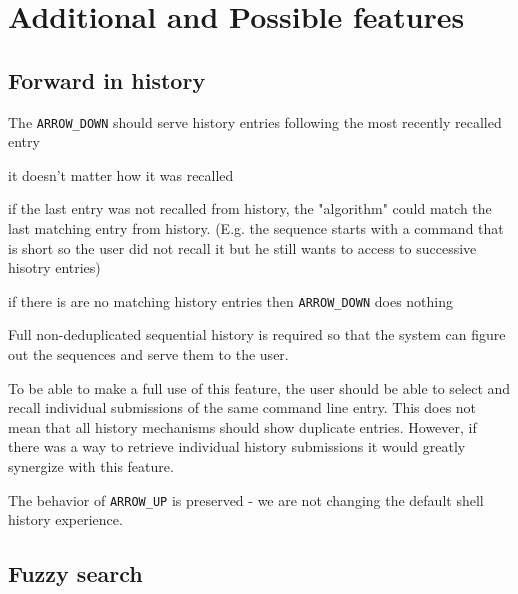 \documentclass[thesis=M,english]{FITthesis}[2012/10/20]
\newcommand{\todotext}[1]{\textcolor{red}{\textbf{[[#1]]}}}
\begin{document}




\section{Additional and Possible features}


\subsection{Forward in history}


The \verb|ARROW_DOWN| should serve history entries following the most recently recalled entry

it doesn't matter how it was recalled

if the last entry was not recalled from history, the "algorithm" could match the last matching entry from history. (E.g. the sequence starts with a command that is short so the user did not recall it but he still wants to access to successive hisotry entries)

if there is are no matching history entries then \verb|ARROW_DOWN| does nothing

Full non-deduplicated sequential history is required so that the system can figure out the sequences and serve them to the user. %

To be able to make a full use of this feature, the user should be able to select and recall individual submissions of the same command line entry. This does not mean that all history mechanisms should show duplicate entries. However, if there was a way to retrieve individual history submissions it would greatly synergize with this feature.

The behavior of \verb|ARROW_UP| is preserved - we are not changing the default shell history experience.

\subsection{Fuzzy search}
\end{document}
